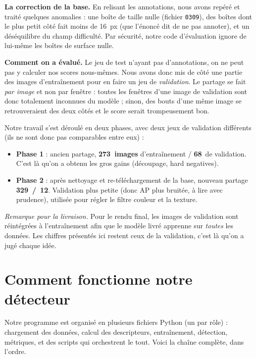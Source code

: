 \documentclass[a4paper,10pt]{article}
\begin{document}
\textbf{La correction de la base.} En relisant les annotations, nous avons repéré et
traité quelques anomalies : une boîte de taille nulle (fichier \texttt{0309}), des
boîtes dont le plus petit côté fait moins de 16~px (que l'énoncé dit de ne pas
annoter), et un déséquilibre du champ difficulté. Par sécurité, notre code
d'évaluation ignore de lui-même les boîtes de surface nulle.

\textbf{Comment on a évalué.} Le jeu de test n'ayant pas d'annotations, on ne peut
pas y calculer nos scores nous-mêmes. Nous avons donc mis de côté une partie des
images d'entraînement pour en faire un jeu de \emph{validation}. Le partage se fait
\emph{par image} et non par fenêtre : toutes les fenêtres d'une image de validation
sont donc totalement inconnues du modèle ; sinon, des bouts d'une même image se
retrouveraient des deux côtés et le score serait trompeusement bon.

Notre travail s'est déroulé en deux phases, avec deux jeux de validation différents
(ils ne sont donc pas comparables entre eux) :
\begin{itemize}[noitemsep,topsep=2pt]
\item \textbf{Phase 1} : ancien partage, \textbf{273~images} d'entraînement /
\textbf{68}~de validation. C'est là qu'on a obtenu les gros gains (découpage, hard
negatives).
\item \textbf{Phase 2} : après nettoyage et re-téléchargement de la base, nouveau
partage \textbf{329~/~12}. Validation plus petite (donc AP plus bruitée, à lire avec
prudence), utilisée pour régler le filtre couleur et la texture.
\end{itemize}

\textit{Remarque pour la livraison.} Pour le rendu final, les images de validation
sont réintégrées à l'entraînement afin que le modèle livré apprenne sur \emph{toutes}
les données. Les chiffres présentés ici restent ceux de la validation, c'est là qu'on
a jugé chaque idée.

\section{Comment fonctionne notre détecteur}
Notre programme est organisé en plusieurs fichiers Python (un par rôle) : chargement
des données, calcul des descripteurs, entraînement, détection, métriques, et des
scripts qui orchestrent le tout. Voici la chaîne complète, dans l'ordre.
\end{document}
